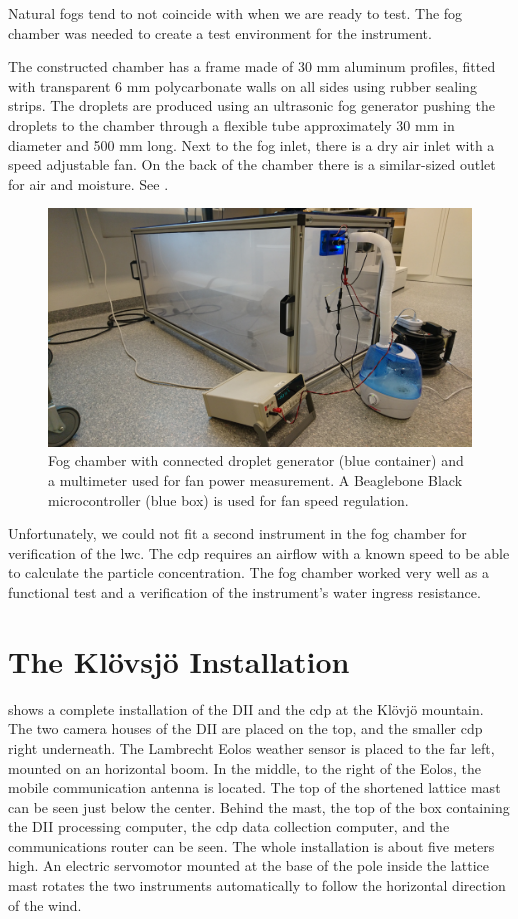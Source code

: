 Natural fogs tend to not coincide with when we are ready to test. The fog chamber was needed to create a test environment for the instrument. 

The constructed chamber has a frame made of 30 mm aluminum profiles, fitted with transparent 6 mm polycarbonate walls on all sides using rubber sealing strips. The droplets are produced using an ultrasonic fog generator pushing the droplets to the chamber through a flexible tube approximately 30 mm in diameter and 500 mm long. Next to the fog inlet, there is a dry air inlet with a speed adjustable fan. On the back of the chamber there is a similar-sized outlet for air and moisture. See .

\begin{figure}[ht]
\centering\includegraphics[width=0.75\linewidth]{figures/DSC_0103}
\caption{Fog chamber with connected droplet generator (blue container) and a multimeter used for fan power measurement. A Beaglebone Black microcontroller (blue box) is used for fan speed regulation.}
\label{fig:fogchamber}
\end{figure}
 
Unfortunately, we could not fit a second instrument in the fog chamber for verification of the \gls{lwc}. The \gls{cdp} requires an airflow with a known speed to be able to calculate the particle concentration. The fog chamber worked very well as a functional test and a verification of the instrument’s water ingress resistance.

\section{The Klövsjö Installation}

 shows a complete installation of the DII and the \gls{cdp} at the Klövjö mountain. The two camera houses of the DII are placed on the top, and the smaller \gls{cdp} right underneath. The Lambrecht Eolos weather sensor is placed to the far left, mounted on an horizontal boom. In the middle, to the right of the Eolos, the mobile communication antenna is located. The top of the shortened lattice mast can be seen just below the center. Behind the mast, the top of the box containing the DII processing computer, the \gls{cdp} data collection computer, and the communications router can be seen. The whole installation is about five meters high. An electric servomotor mounted at the base of the pole inside the lattice mast rotates the two instruments automatically to follow the horizontal direction of the wind. 

